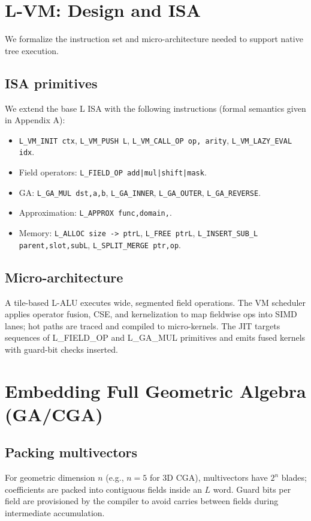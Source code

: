 \documentclass[11pt]{article}
\theoremstyle{definition}
\theoremstyle{plain}
\begin{document}
\section{L-VM: Design and ISA}
We formalize the instruction set and micro-architecture needed to support native tree execution.

\subsection{ISA primitives}
We extend the base L ISA with the following instructions (formal semantics given in Appendix A):
\begin{itemize}
  \item \texttt{L\_VM\_INIT ctx}, \texttt{L\_VM\_PUSH L}, \texttt{L\_VM\_CALL\_OP op, arity}, \texttt{L\_VM\_LAZY\_EVAL idx}.
  \item Field operators: \texttt{L\_FIELD\_OP add|mul|shift|mask}.
  \item GA: \texttt{L\_GA\_MUL dst,a,b}, \texttt{L\_GA\_INNER}, \texttt{L\_GA\_OUTER}, \texttt{L\_GA\_REVERSE}.
  \item Approximation: \texttt{L\_APPROX func,domain,\epsilon}.
  \item Memory: \texttt{L\_ALLOC size -> ptrL}, \texttt{L\_FREE ptrL}, \texttt{L\_INSERT\_SUB\_L parent,slot,subL}, \texttt{L\_SPLIT\_MERGE ptr,op}.
\end{itemize}

\subsection{Micro-architecture}
A tile-based L-ALU executes wide, segmented field operations. The VM scheduler applies operator fusion, CSE, and kernelization to map fieldwise ops into SIMD lanes; hot paths are traced and compiled to micro-kernels. The JIT targets sequences of L\_FIELD\_OP and L\_GA\_MUL primitives and emits fused kernels with guard-bit checks inserted.

\section{Embedding Full Geometric Algebra (GA/CGA)}
\subsection{Packing multivectors}
For geometric dimension \(n\) (e.g., \(n=5\) for 3D CGA), multivectors have \(2^n\) blades; coefficients are packed into contiguous fields inside an \(L\) word. Guard bits per field are provisioned by the compiler to avoid carries between fields during intermediate accumulation.
\end{document}
